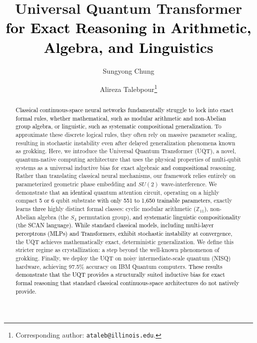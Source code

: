 \documentclass[11pt, a4paper]{article}
\title{\textbf{Universal Quantum Transformer \textcolor{black}{for Exact Reasoning in Arithmetic, Algebra, and Linguistics}}}
\author[1,2]{Sungyong Chung\orcidlink{0009-0001-3131-6011}}
\author[1,2]{Alireza Talebpour\orcidlink{0000-0002-5412-5592}\thanks{Corresponding author: \texttt{ataleb@illinois.edu}.}}
\affil[1]{Grainger College of Engineering, Department of Civil and Environmental Engineering, University of Illinois Urbana-Champaign}
\affil[2]{Quantaeon Inc.}
\date{}
\begin{document}
\maketitle


\begin{abstract}
\noindent \textcolor{black}{Classical continuous-space neural networks fundamentally struggle to lock into exact formal rules, whether mathematical, such as modular arithmetic and non-Abelian group algebra, or linguistic, such as systematic compositional generalization.} To approximate these discrete logical rules, they often rely on massive parameter scaling, resulting in stochastic instability even after delayed generalization phenomena known as grokking. Here, we introduce the Universal Quantum Transformer (UQT), a novel, quantum-native computing architecture that uses the physical properties of multi-qubit systems as a universal inductive bias for exact algebraic \textcolor{black}{and compositional} reasoning. Rather than translating classical neural mechanisms, our framework relies entirely on parameterized geometric phase embedding and $SU(2)$ wave-interference. We demonstrate that \textcolor{black}{an identical} quantum attention circuit, operating on a highly compact \textcolor{black}{5 or 6} qubit substrate \textcolor{black}{with only 551 to 1,650 trainable parameters}, exactly learns \textcolor{black}{three} highly distinct formal classes: cyclic modular arithmetic ($\mathbb{Z}_{11}$), non-Abelian algebra (the $S_4$ permutation group)\textcolor{black}{, and systematic linguistic compositionality (the SCAN language).} \textcolor{black}{While standard classical models, including multi-layer perceptrons (MLPs) and Transformers, exhibit stochastic instability at convergence,} the UQT achieves mathematically exact, deterministic generalization. We define this stricter regime as crystallization: a step beyond the well-known phenomenon of grokking. Finally, we deploy the UQT on noisy intermediate-scale quantum (NISQ) hardware, achieving 97.5\% accuracy on IBM Quantum computers. \textcolor{black}{These results demonstrate that the UQT provides a structurally suited inductive bias for exact formal reasoning that standard classical continuous-space architectures do not natively provide.}
\end{abstract}
\end{document}
